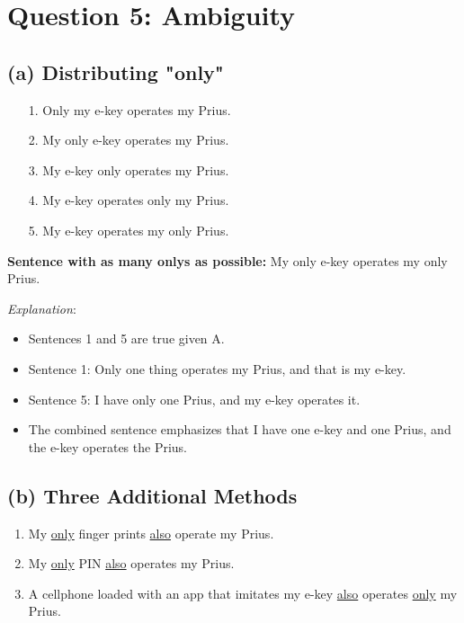 \documentclass{article}
\begin{document}
\section*{Question 5: Ambiguity}

\subsection*{(a) Distributing "only"}

\begin{itemize}
    \item[1.] \checkmark Only my e-key operates my Prius.
    \item[2.] My only e-key operates my Prius.
    \item[3.] My e-key only operates my Prius.
    \item[4.] My e-key operates only my Prius.
    \item[5.] \checkmark My e-key operates my only Prius.
\end{itemize}

\textbf{Sentence with as many onlys as possible:}
My only e-key operates my only Prius.

\textit{Explanation}:
\begin{itemize}
    \item Sentences 1 and 5 are true given A.
    \item Sentence 1: Only one thing operates my Prius, and that is my e-key.
    \item Sentence 5: I have only one Prius, and my e-key operates it.
    \item The combined sentence emphasizes that I have one e-key and one Prius, and the e-key operates the Prius.
\end{itemize}

\subsection*{(b) Three Additional Methods}

\begin{enumerate}[label=(\arabic*)]
    \item My \underline{only} finger prints \underline{also} operate my Prius.
    \item My \underline{only} PIN \underline{also} operates my Prius.
    \item A cellphone loaded with an app that imitates my e-key \underline{also} operates \underline{only} my Prius.
\end{enumerate}
\end{document}
